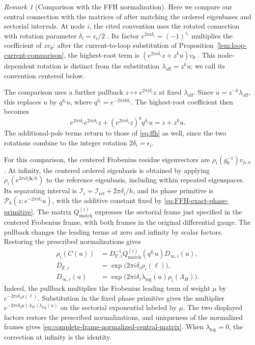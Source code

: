 \documentclass[11pt,leqno]{amsart}
\numberwithin{equation}{section}
\theoremstyle{plain}
\theoremstyle{definition}
\theoremstyle{plain}
\theoremstyle{definition}
\theoremstyle{remark}
\newtheorem{remark}[theorem]{Remark}
\begin{document}
\begin{remark}[Comparison with the FFH normalization]\label{rem:FFH-normalization-comparison}
Here we compare our central connection with the matrices of \cite[Section~3.3]{MR2024} after matching the ordered eigenbases and sectorial intervals.  At node $i$, the cited convention uses the rotated connection with rotation parameter $\delta_i=\epsilon_i/2$ \cite[Table~3 and (3.19)]{MR2024}.  Its factor $e^{2\pi i\delta_i}=(-1)^{\epsilon_i}$ multiplies the coefficient of $zv_\theta$: after the current-to-loop substitution of Proposition~\ref{lem:loop-current-comparison}, the highest-root term is $(e^{2\pi i\delta_i}z+z^ku)v_\theta$ \cite[(3.6)]{MR2024}.  This node-dependent rotation is distinct from the substitution $\lambda_{\mathrm{aff}}=z^ku$; we call its convention centered below.

The comparison uses a further pullback $z\mapsto e^{2\pi i\delta_i}z$ at fixed $\lambda_{\mathrm{aff}}$.  Since $u=z^{-k}\lambda_{\mathrm{aff}}$, this replaces $u$ by $q^{\delta_i}u$, where $q^{\delta_i}=e^{-2\pi ik\delta_i}$.  The highest-root coefficient then becomes
\[
 e^{2\pi i\delta_i}e^{2\pi i\delta_i}z
 +(e^{2\pi i\delta_i}z)^kq^{\delta_i}u
 =z+z^ku.
\]
The additional-pole terms return to those of \eqref{eq:ffh} as well, since the two rotations combine to the integer rotation $2\delta_i=\epsilon_i$.

For this comparison, the centered Frobenius residue eigenvectors are $\rho_i(g_0^{-1})v_{\mu,a}$.  At infinity, the centered ordered eigenbasis is obtained by applying $\rho_i(e^{2\pi i\delta_i\mathbf h/h})$ to the reference eigenbasis, including within repeated eigenspaces.  Its separating interval is $\mathcal I_i=\mathcal I_{\mathrm{ref}}+2\pi\delta_i/h$, and its phase primitive is $\mathcal P_k(z;e^{-2\pi i\delta_i}u)$, with the additive constant fixed by \eqref{eq:FFH-exact-phase-primitive}.  The matrix $Q_{\mathrm{match}}^{(i)}$ expresses the sectorial frame just specified in the centered Frobenius frame, with both frames in the original differential gauge.  The pullback changes the leading terms at zero and infinity by scalar factors.  Restoring the prescribed normalizations gives
\begin{equation}\label{eq:complete-frame-normalized-central-matrix}
 \begin{aligned}
 \rho_i(C(u))
 &=D_{\mathrm F,i}^{-1}Q_{\mathrm{match}}^{(i)}(q^{\delta_i}u)D_{\infty,i}(u),\\
 D_{\mathrm F,i}
 &=\exp\!\bigl(2\pi i\delta_i\rho_i(\ell)\bigr),\\
 D_{\infty,i}(u)
 &=\exp\!\bigl(2\pi i\delta_i\lambda_{\log}(u)\rho_i(\Lambda_H)\bigr).
 \end{aligned}
\end{equation}
Indeed, the pullback multiplies the Frobenius leading term of weight $\mu$ by $e^{-2\pi i\delta_i\mu(\ell)}$.  Substitution in the fixed phase primitive gives the multiplier $e^{-2\pi i\delta_i\mu(\Lambda_H)\lambda_{\log}(u)}$ on the sectorial exponential labeled by $\mu$.  The two displayed factors restore the prescribed normalizations, and uniqueness of the normalized frames gives \eqref{eq:complete-frame-normalized-central-matrix}.  When $\lambda_{\log}=0$, the correction at infinity is the identity.


\end{remark}
\end{document}
